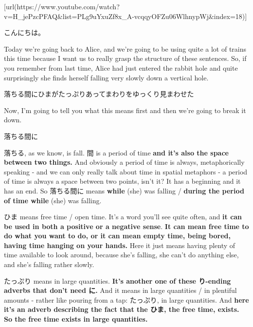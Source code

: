 \startsectionlevel[title={{\bf 16. てみる, や particle, から particle, exclusive and}},reference={てみる-や-particle-から-particle-exclusive-and}]

[url(https://www.youtube.com/watch?v=H_jePzcPFAQ&list=PLg9uYxuZf8x_A-vcqqyOFZu06WlhnypWj&index=18)]

こんにちは。

Today we're going back to Alice, and we're going to be using quite a lot of trains this time because I want us to really grasp the structure of these sentences. So, if you remember from last time, Alice had just entered the rabbit hole and quite surprisingly she finds herself falling very slowly down a vertical hole.

{}

\startblockquote
落ちる間にひまがたっぷりあってまわりをゆっくり見まわせた
\stopblockquote

Now, I'm going to tell you what this means first and then we're going to break it down.

落ちる間に

落ちる, as we know, is fall. 間 is a period of time {\bf and it's also the space between two things.} And obviously a period of time is always, metaphorically speaking - and we can only really talk about time in spatial metaphors - a period of time is always a space between two points, isn't it? It has a beginning and it has an end. So 落ちる間に means {\bf while} (she) was falling / {\bf during the period of time while} (she) was falling.

\thinrule

ひま means free time / open time. It's a word you'll see quite often, and {\bf it can be used in both a positive or a negative sense}. {\bf It can mean free time to do what you want to do, or it can mean empty time, being bored, having time hanging on your hands.} Here it just means having plenty of time available to look around, because she's falling, she can't do anything else, and she's falling rather slowly.

\thinrule

たっぷり means in large quantities. {\bf It's another one of these り-ending adverbs that don't need に.} And it means in large quantities / in plentiful amounts - rather like pouring from a tap: たっぷり, in large quantities. And {\bf here it's an adverb describing the fact that the ひま, the free time, exists.} {\bf So the free time exists in large quantities.}

